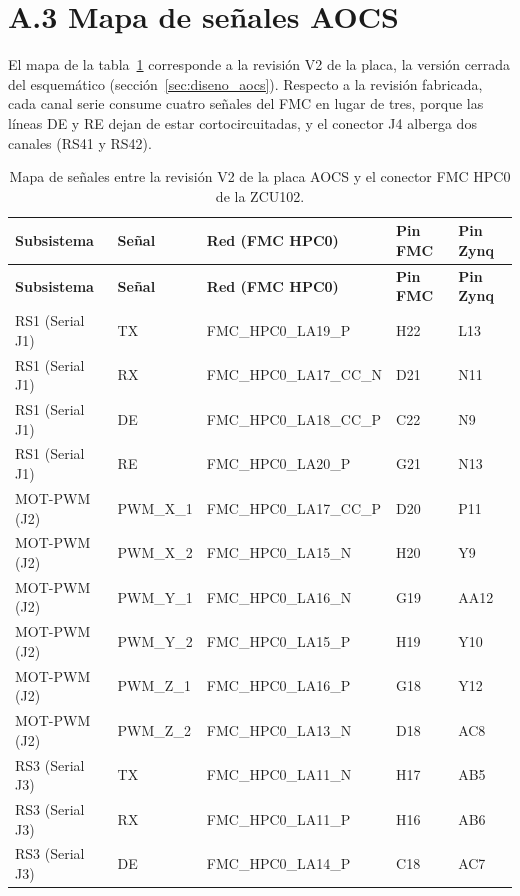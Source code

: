 \section*{A.3 Mapa de señales AOCS}

El mapa de la tabla~\ref{tab:mapa_aocs} corresponde a la revisión V2 de la placa, la versión
cerrada del esquemático (sección~\ref{sec:diseno_aocs}). Respecto a la revisión fabricada, cada canal serie consume
cuatro señales del FMC en lugar de tres, porque las líneas DE y RE dejan de estar
cortocircuitadas, y el conector J4 alberga dos canales (RS41 y RS42).

{\small
\begin{longtable}{lllll}
    \caption{Mapa de señales entre la revisión V2 de la placa AOCS y el conector FMC HPC0 de la
    ZCU102.} \label{tab:mapa_aocs} \\
    \hline
    \textbf{Subsistema} & \textbf{Señal} & \textbf{Red (FMC HPC0)} & \textbf{Pin FMC} & \textbf{Pin Zynq} \\
    \hline
    \endfirsthead
    \hline
    \textbf{Subsistema} & \textbf{Señal} & \textbf{Red (FMC HPC0)} & \textbf{Pin FMC} & \textbf{Pin Zynq} \\
    \hline
    \endhead
    \hline
    \endfoot
    RS1 (Serial J1) & TX & FMC\_HPC0\_LA19\_P & H22 & L13 \\
    RS1 (Serial J1) & RX & FMC\_HPC0\_LA17\_CC\_N & D21 & N11 \\
    RS1 (Serial J1) & DE & FMC\_HPC0\_LA18\_CC\_P & C22 & N9 \\
    RS1 (Serial J1) & RE & FMC\_HPC0\_LA20\_P & G21 & N13 \\
    MOT-PWM (J2) & PWM\_X\_1 & FMC\_HPC0\_LA17\_CC\_P & D20 & P11 \\
    MOT-PWM (J2) & PWM\_X\_2 & FMC\_HPC0\_LA15\_N & H20 & Y9 \\
    MOT-PWM (J2) & PWM\_Y\_1 & FMC\_HPC0\_LA16\_N & G19 & AA12 \\
    MOT-PWM (J2) & PWM\_Y\_2 & FMC\_HPC0\_LA15\_P & H19 & Y10 \\
    MOT-PWM (J2) & PWM\_Z\_1 & FMC\_HPC0\_LA16\_P & G18 & Y12 \\
    MOT-PWM (J2) & PWM\_Z\_2 & FMC\_HPC0\_LA13\_N & D18 & AC8 \\
    RS3 (Serial J3) & TX & FMC\_HPC0\_LA11\_N & H17 & AB5 \\
    RS3 (Serial J3) & RX & FMC\_HPC0\_LA11\_P & H16 & AB6 \\
    RS3 (Serial J3) & DE & FMC\_HPC0\_LA14\_P & C18 & AC7 \\

\end{longtable}}
